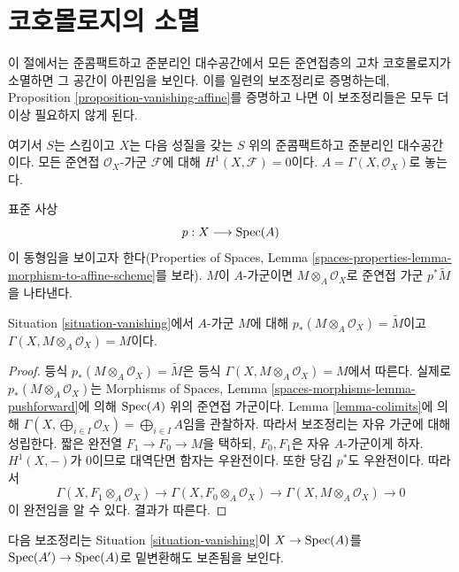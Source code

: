 \section{코호몰로지의 소멸}
\label{section-vanishing}

\noindent
이 절에서는 준콤팩트하고 준분리인 대수공간에서 모든 준연접층의 고차
코호몰로지가 소멸하면 그 공간이 아핀임을 보인다. 이를 일련의
보조정리로 증명하는데, Proposition
\ref{proposition-vanishing-affine}를 증명하고 나면 이 보조정리들은 모두
더 이상 필요하지 않게 된다.

\begin{situation}
\label{situation-vanishing}
여기서 $S$는 스킴이고 $X$는 다음 성질을 갖는 $S$ 위의 준콤팩트하고
준분리인 대수공간이다. 모든 준연접 $\mathcal{O}_X$-가군
$\mathcal{F}$에 대해 $H^1(X, \mathcal{F}) = 0$이다.
$A = \Gamma(X, \mathcal{O}_X)$로 놓는다.
\end{situation}

\noindent
표준 사상
$$
p : X \longrightarrow \mathop{\mathrm{Spec}}(A)
$$
이 동형임을 보이고자 한다(Properties of Spaces, Lemma
\ref{spaces-properties-lemma-morphism-to-affine-scheme}를 보라).
$M$이 $A$-가군이면
$M \otimes_A \mathcal{O}_X$로 준연접 가군 $p^*\tilde M$을 나타낸다.

\begin{lemma}
\label{lemma-vanishing-compute}
Situation \ref{situation-vanishing}에서 $A$-가군 $M$에 대해
$p_*(M \otimes_A \mathcal{O}_X) = \widetilde{M}$이고
$\Gamma(X, M \otimes_A \mathcal{O}_X) = M$이다.
\end{lemma}

\begin{proof}
등식 $p_*(M \otimes_A \mathcal{O}_X) = \widetilde{M}$은 등식
$\Gamma(X, M \otimes_A \mathcal{O}_X) = M$에서 따른다. 실제로
$p_*(M \otimes_A \mathcal{O}_X)$는 Morphisms of Spaces, Lemma
\ref{spaces-morphisms-lemma-pushforward}에 의해 $\mathop{\mathrm{Spec}}(A)$ 위의 준연접
가군이다. Lemma \ref{lemma-colimits}에 의해
$\Gamma(X, \bigoplus_{i \in I} \mathcal{O}_X) =
\bigoplus_{i \in I} A$임을 관찰하자. 따라서 보조정리는 자유 가군에 대해
성립한다. 짧은 완전열 $F_1 \to F_0 \to M$을 택하되,
$F_0, F_1$은 자유 $A$-가군이게 하자. $H^1(X, -)$가 0이므로 대역단면 함자는
우완전이다. 또한 당김 $p^*$도 우완전이다. 따라서
$$
\Gamma(X, F_1 \otimes_A \mathcal{O}_X) \to
\Gamma(X, F_0 \otimes_A \mathcal{O}_X) \to
\Gamma(X, M \otimes_A \mathcal{O}_X) \to 0
$$
이 완전임을 알 수 있다. 결과가 따른다.
\end{proof}

\noindent
다음 보조정리는 Situation \ref{situation-vanishing}이
$X \to \mathop{\mathrm{Spec}}(A)$를 $\mathop{\mathrm{Spec}}(A') \to \mathop{\mathrm{Spec}}(A)$로 밑변환해도
보존됨을 보인다.

